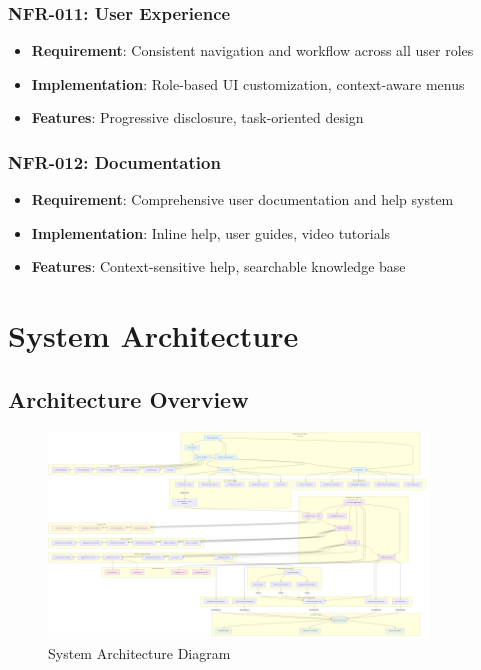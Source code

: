 \documentclass[12pt,a4paper]{article}
\begin{document}
\subsubsection{NFR-011: User Experience}
\begin{itemize}
    \item \textbf{Requirement}: Consistent navigation and workflow across all user roles
    \item \textbf{Implementation}: Role-based UI customization, context-aware menus
    \item \textbf{Features}: Progressive disclosure, task-oriented design
\end{itemize}

\subsubsection{NFR-012: Documentation}
\begin{itemize}
    \item \textbf{Requirement}: Comprehensive user documentation and help system
    \item \textbf{Implementation}: Inline help, user guides, video tutorials
    \item \textbf{Features}: Context-sensitive help, searchable knowledge base
\end{itemize}

\section{System Architecture}

\subsection{Architecture Overview}

\begin{figure}[H]
\centering
\includegraphics[width=0.9\textwidth]{diagrams/system_architecture}
\caption{System Architecture Diagram}
\label{fig:system-architecture}
\end{figure}
\end{document}
